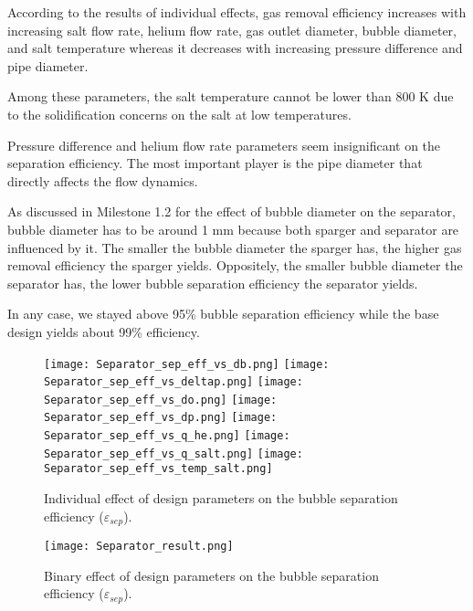     According to the results of individual effects, gas removal efficiency increases with increasing salt flow rate, helium flow rate, gas outlet diameter, bubble diameter, and salt temperature whereas it decreases with increasing pressure difference and pipe diameter.

    Among these parameters, the salt temperature cannot be lower than 800 K due to the solidification concerns on the salt at low temperatures.

    Pressure difference and helium flow rate parameters seem insignificant on the separation efficiency. The most important player is the pipe diameter that directly affects the flow dynamics.

    As discussed in Milestone 1.2 for the effect of bubble diameter on the separator, bubble diameter has to be around 1 mm because both sparger and separator are influenced by it. The smaller the bubble diameter the sparger has, the higher gas removal efficiency the sparger yields. Oppositely, the smaller bubble diameter the separator has, the lower bubble separation efficiency the separator yields.

    In any case, we stayed above 95\% bubble separation efficiency while the base design yields about 99\% efficiency.

\begin{figure}[htbp!]
    \begin{center}
        \texttt{[image: Separator\_sep\_eff\_vs\_db.png]}
        \texttt{[image: Separator\_sep\_eff\_vs\_deltap.png]}
        \texttt{[image: Separator\_sep\_eff\_vs\_do.png]}
        \texttt{[image: Separator\_sep\_eff\_vs\_dp.png]}
        \texttt{[image: Separator\_sep\_eff\_vs\_q\_he.png]}
        \texttt{[image: Separator\_sep\_eff\_vs\_q\_salt.png]}
        \texttt{[image: Separator\_sep\_eff\_vs\_temp\_salt.png]}
    \end{center}
    \caption{Individual effect of design parameters on the bubble separation efficiency ($\varepsilon$$_{sep}$).}
    \label{fig:individual_eff_separator}
\end{figure}

\begin{figure}[htbp!]
    \begin{center}
        \texttt{[image: Separator\_result.png]}
    \end{center}
    \caption{Binary effect of design parameters on the bubble separation
    efficiency ($\varepsilon$$_{sep}$).}
    \label{fig:binary_eff_separator}
\end{figure}

